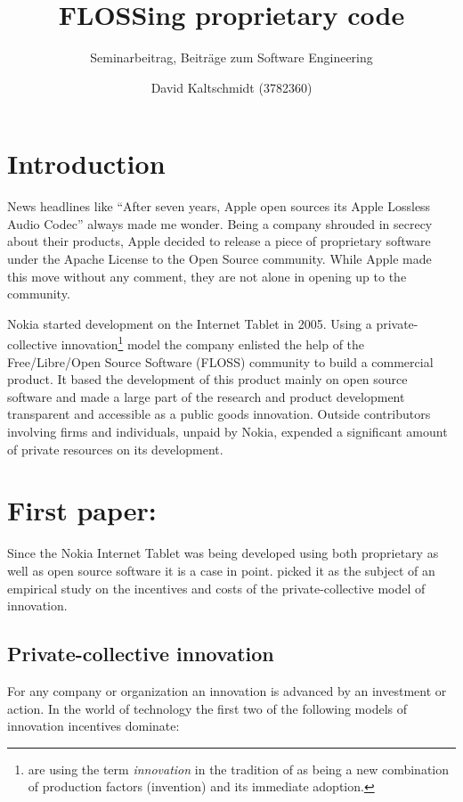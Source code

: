 \documentclass[a4paper]{scrartcl}
\title{FLOSSing proprietary code}
\subtitle{Seminarbeitrag, Beiträge zum Software Engineering}
\author{David Kaltschmidt (3782360)}
\begin{document}
\maketitle

\section{Introduction}

News headlines like ``After seven years, Apple open sources its Apple Lossless Audio Codec''\cite{ars201110alac} always made me wonder.
Being a company shrouded in secrecy about their products, Apple decided to release a piece of proprietary software under the Apache License to the Open Source community. 
While Apple made this move without any comment, they are not alone in opening up to the community.

Nokia started development on the Internet Tablet in 2005. 
Using a private-collective innovation\footnote{\citeauthor{stuermer2009extending} are using the term \emph{innovation} in the tradition of \textcite[Ch 3.B, p. 83]{schumpeter1939business} as being a new combination of production factors (invention) and its immediate adoption.} model the company enlisted the help of the Free/Libre/Open Source Software (FLOSS) community to build a commercial product. 
It based the development of this product mainly on open
source software and made a large part of the
research and product development transparent
and accessible as a public goods innovation.
Outside contributors involving firms and individuals,
unpaid by Nokia, expended a significant
amount of private resources on its development.

\section{First paper: }

Since the Nokia Internet Tablet was being developed using both proprietary as well as open source software it is a case in point. 
\citeauthor{stuermer2009extending} picked it as the subject of an empirical study on the incentives and costs of the private-collective model of innovation.

\subsection{Private-collective innovation}

For any company or organization an innovation is advanced by an investment or action.
In the world of technology the first two of the following models of innovation incentives dominate:
\end{document}
